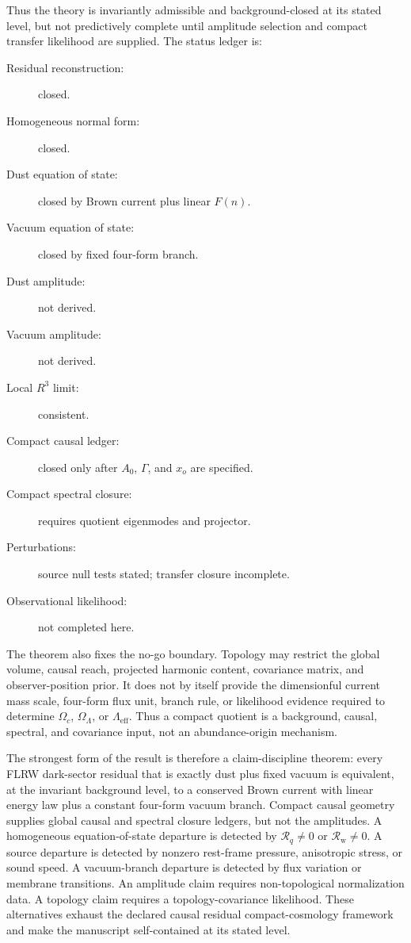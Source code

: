 \documentclass[
  aps,
  prd,
  reprint,
  superscriptaddress,
  floatfix,
  nofootinbib,
  longbibliography
]{revtex4-2}
\theoremstyle{plain}
\theoremstyle{definition}
\theoremstyle{remark}
\newcommand{\wind}{\mathrm w}
\newcommand{\eff}{\mathrm{eff}}
\newcommand{\Rcl}{\mathcal R}
\begin{document}
Thus the theory is invariantly admissible and background-closed at its stated
level, but not predictively complete until amplitude selection and compact
transfer likelihood are supplied.  The status ledger is:
\begin{description}
\item[Residual reconstruction:] closed.
\item[Homogeneous normal form:] closed.
\item[Dust equation of state:] closed by Brown current plus linear $F(n)$.
\item[Vacuum equation of state:] closed by fixed four-form branch.
\item[Dust amplitude:] not derived.
\item[Vacuum amplitude:] not derived.
\item[Local $R^3$ limit:] consistent.
\item[Compact causal ledger:] closed only after $A_0$, $\Gamma$, and $x_o$ are specified.
\item[Compact spectral closure:] requires quotient eigenmodes and projector.
\item[Perturbations:] source null tests stated; transfer closure incomplete.
\item[Observational likelihood:] not completed here.
\end{description}

The theorem also fixes the no-go boundary.  Topology may restrict the global
volume, causal reach, projected harmonic content, covariance matrix, and
observer-position prior.  It does not by itself provide the dimensionful current
mass scale, four-form flux unit, branch rule, or likelihood evidence required to
determine \(\Omega_c\), \(\Omega_\Lambda\), or \(\Lambda_{\eff}\).  Thus a
compact quotient is a background, causal, spectral, and covariance input, not an
abundance-origin mechanism.

The strongest form of the result is therefore a claim-discipline theorem:
every FLRW dark-sector residual that is exactly dust plus fixed vacuum is
equivalent, at the invariant background level, to a conserved Brown current with
linear energy law plus a constant four-form vacuum branch.  Compact causal
geometry supplies global causal and spectral closure ledgers, but not the
amplitudes.  A homogeneous equation-of-state departure is detected by
\(\Rcl_q\ne0\) or \(\Rcl_{\wind}\ne0\).  A source departure is detected by
nonzero rest-frame pressure, anisotropic stress, or sound speed.  A vacuum-branch
departure is detected by flux variation or membrane transitions.  An amplitude
claim requires non-topological normalization data.  A topology claim requires a
topology-covariance likelihood.  These alternatives exhaust the declared causal
residual compact-cosmology framework and make the manuscript self-contained at
its stated level.
\end{document}
